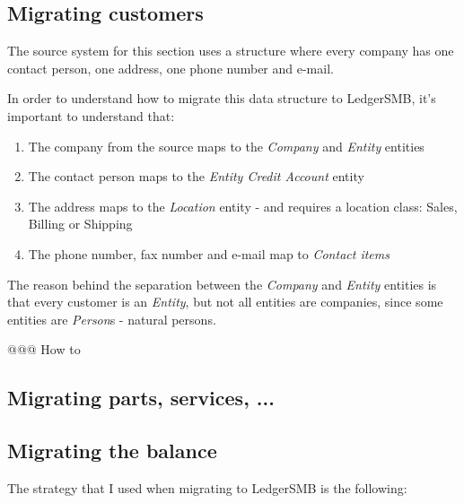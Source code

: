 \subsection{Migrating customers}
\label{subsec-migration-others-customers}

The source system for this section uses a structure where every company has one
contact person, one address, one phone number and e-mail.

In order to understand how to migrate this data structure to LedgerSMB, it's
important to understand that:

\begin{enumerate}
\item The company from the source maps to the \emph{Company} and \emph{Entity} entities
\item The contact person maps to the \emph{Entity Credit Account} entity
\item The address maps to the \emph{Location} entity - and requires a location class: Sales, Billing or Shipping
\item The phone number, fax number and e-mail map to \emph{Contact items}
\end{enumerate}

The reason behind the separation between the \emph{Company} and \emph{Entity} entities
is that every customer is an \emph{Entity}, but not all entities are companies, since
some entities are \emph{Person}s - natural persons.

@@@ How to

\subsection{Migrating parts, services, ...}
\label{subsec-migration-others-products}

\subsection{Migrating the balance}
\label{subsec-migration-others-balance}

The strategy that I used when migrating to LedgerSMB is the following:

